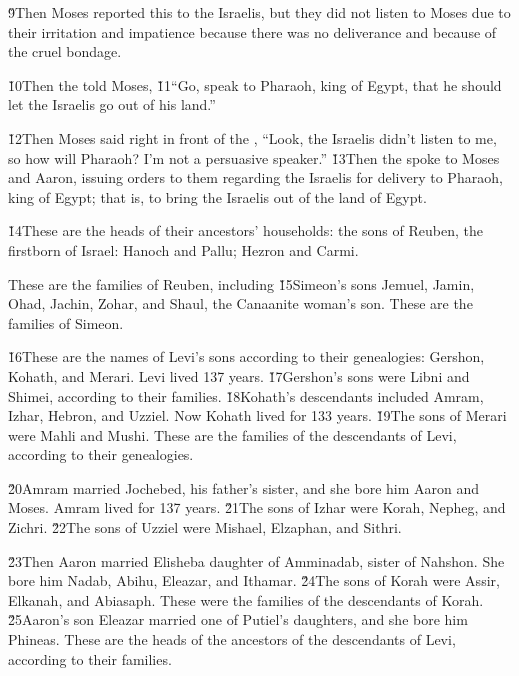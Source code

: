 \v{9}Then Moses reported this to the Israelis, but they did not listen to Moses due to their irritation and impatience because there was no deliverance and because of the cruel bondage.

\v{10}Then the  told Moses, \v{11}``Go, speak to Pharaoh, king of Egypt, that he should let the Israelis go out of his land.''

\v{12}Then Moses said right in front of the , ``Look, the Israelis didn't listen to me, so how will Pharaoh? I'm not a persuasive speaker.'' \v{13}Then the  spoke to Moses and Aaron, issuing orders to them regarding the Israelis for delivery to Pharaoh, king of Egypt; that is, to bring the Israelis out of the land of Egypt.

\v{14}These are the heads of their ancestors' households: the sons of Reuben, the firstborn of Israel: Hanoch and Pallu; Hezron and Carmi.

These are the families of Reuben, including \v{15}Simeon's sons Jemuel, Jamin, Ohad, Jachin, Zohar, and Shaul, the Canaanite woman's son. These are the families of Simeon.

\v{16}These are the names of Levi's sons according to their genealogies: Gershon, Kohath, and Merari. Levi lived 137 years. \v{17}Gershon's sons were Libni and Shimei, according to their families. \v{18}Kohath's descendants included Amram, Izhar, Hebron, and Uzziel. Now Kohath lived for 133 years. \v{19}The sons of Merari were Mahli and Mushi. These are the families of the descendants of Levi, according to their genealogies.

\v{20}Amram married Jochebed, his father's sister, and she bore him Aaron and Moses. Amram lived for 137 years. \v{21}The sons of Izhar were Korah, Nepheg, and Zichri. \v{22}The sons of Uzziel were Mishael, Elzaphan, and Sithri.

\v{23}Then Aaron married Elisheba daughter of Amminadab, sister of Nahshon. She bore him Nadab, Abihu, Eleazar, and Ithamar. \v{24}The sons of Korah were Assir, Elkanah, and Abiasaph. These were the families of the descendants of Korah. \v{25}Aaron's son Eleazar married one of Putiel's daughters, and she bore him Phineas. These are the heads of the ancestors of the descendants of Levi, according to their families.

